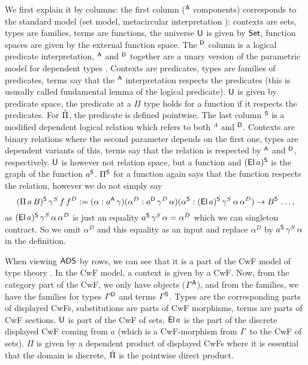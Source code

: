 \documentclass[a4paper,UKenglish,cleveref, autoref]{lipics-v2019}
\begin{document}
We first explain it by columns: the first column ($^\A$ components)
corresponds to the standard model (set model, metacircular
interpretation \cite{ttintt}): contexts are sets, types are families,
terms are functions, the universe $\U$ is given by $\Set$, function
spaces are given by the external function space. The $^\D$ column is a
logical predicate interpretation, $^\A$ and $^\D$ together are a unary
version of the parametric model for dependent types
\cite{10.1145/2535838.2535852}. Contexts are predicates, types are
families of predicates, terms say that the $^\A$ interpretation
respects the predicates (this is ususally called fundamental lemma of
the logical predicate). $\U$ is given by predicate space, the
predicate at a $\Pi$ type holds for a function if it respects the
predicates. For $\Pim$, the predicate is defined pointwise. The last
column $^\S$ is a modified dependent logical relation which refers to
both $^A$ and $^\D$. Contexts are binary relations where the second
parameter depends on the first one, types are dependent variants of
this, terms say that the relation is respected by $^\A$ and $^\D$,
respectively. $\U$ is however not relation space, but a function and
$(\El\,a)^\S$ is the graph of the function $a^\S$. $\Pi^\S$ for a
function again says that the function respects the relation, however
we do not simply say
\[
  (\Pi\,a\,B)^\S\,\gamma^S\,f\,f^D := (\alpha:a^\A\,\gamma)(\alpha^D:a^\D\,\gamma^D\,\alpha)(\alpha^\S:(\El\,a)^\S\,\gamma^S\,\alpha\,\alpha^D)\ra B^\S\,\dots,
\]
as $(\El\,a)^\S\,\gamma^S\,\alpha\,\alpha^D$ is just an equality
$a^\S\,\gamma^S\,\alpha = \alpha^D$ which we can singleton
contract. So we omit $\alpha^D$ and this equality as an input and
replace $\alpha^D$ by $a^\S\,\gamma^S\,\alpha$ in the definition.

When viewing $\ADS$ by rows, we can see that it is a part of the CwF
model of type theory \cite[Section
7.4]{Kaposi:2019:CQI:3302515.3290315}. In the CwF model, a context is
given by a CwF. Now, from the category part of the CwF, we only have
objects ($\GG^\A$), and from the families, we have the families for
types $\GG^\D$ and terms $\GG^\S$. Types are the corresponding
parts of displayed CwFs, substitutions are parts of CwF morphisms,
terms are parts of CwF sections. $\U$ is part of the CwF of sets,
$\El\,a$ is the part of the discrete displayed CwF coming from $a$
(which is a CwF-morphism from $\GG$ to the CwF of sets). $\Pi$ is
given by a dependent product of displayed CwFs where it is essential
that the domain is discrete, $\Pim$ is the pointwise direct product.
\end{document}
